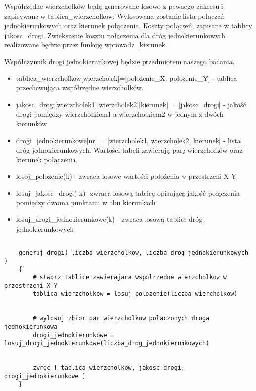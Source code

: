 \documentclass{article}
\begin{document}
Współrzędne wierzchołków będą generowane losowo z pewnego zakresu i zapisywane w tablica\_wierzcholkow. Wylosowana zostanie lista połączeń jednokierunkowych oraz kierunek połączenia. Koszty połączeń, zapisane w tablicy jakosc\_drogi. Zwiększenie kosztu połączenia dla dróg jednokierunkowych realizowane będzie przez funkcję wprowadz\_kierunek.

Współczynnik drogi jednokierunkowej będzie przedmiotem naszego badania. \\

\begin{itemize}
\item tablica\_wierzcholkow[wierzcholek]=[polożenie\_X, położenie\_Y] - tablica przechowująca współrzędne wierzchołków.
\item jakosc\_drogi[wierzcholek1][wierzcholek2][kierunek] = [jakosc\_drogi] - jakość drogi pomiędzy wierzchołkiem1 a wierzchołkiem2 w jednym z dwóch kierunków
\item drogi\_jednokierunkowe[nr] = [wierzcholek1, wierzcholek2, kierunek] - lista dróg jednokierunkowych. Wartości tabeli zawierają parę wierzchołków oraz kierunek połączenia.
\item losoj\_polozenie(k) -  zwraca losowe wartości położenia w przestrzeni X-Y
\item losuj\_jakosc\_drogi( k) -zwraca losową tablicę opisującą jakość połączenia pomiędzy dwoma punktami w obu kierunkach
\item losuj\_drogi\_jednokierunkowe(k) - zwraca losową tablice dróg jednokierunkowych
\end{itemize}

\begin{lstlisting}[caption={Funkcja generujaca dane wejsiowe}]

	generuj_drogi( liczba_wierzcholkow, liczba_drog_jednokierunkowych 	)
	{	
		# stworz tablice zawierajaca wspolrzedne wierzcholkow w przestrzeni X-Y
		tablica_wierzcholkow = losuj_polozenie(liczba_wiercholkow)

		
		# wylosuj zbior par wierzcholkow polaczonych droga jednokierunkowa
		drogi_jednokierunkowe = losuj_drogi_jednokierunkowe(liczba_drog_jednokierunkowych)

		
		zwroc [ tablica_wierzcholkow, jakosc_drogi, drogi_jednokierunkowe ]
	}
		

\end{lstlisting}
\end{document}
